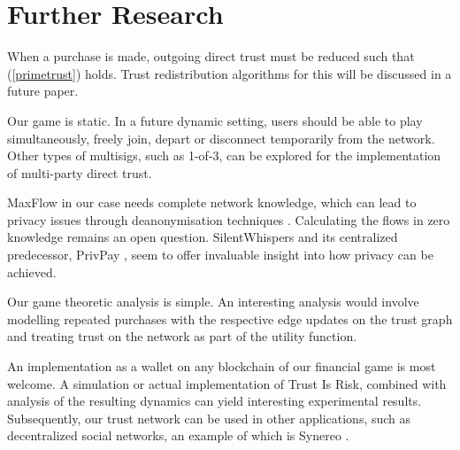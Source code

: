 \section{Further Research}

    When a purchase is made, outgoing direct trust must be reduced such that (\ref{primetrust}) holds. Trust redistribution
    algorithms for this will be discussed in a future paper.
    
    Our game is static. In a future dynamic setting, users should be able to play simultaneously, freely join, depart or
    disconnect temporarily from the network. Other types of multisigs, such as 1-of-3, can be explored for the
    implementation of multi-party direct trust.

    MaxFlow in our case needs complete network knowledge, which can lead to privacy issues through deanonymisation
    techniques \cite{deanonymisation}. Calculating the flows in zero knowledge remains an open question.
    SilentWhispers \cite{silentwhispers} and its centralized predecessor, PrivPay \cite{privpay}, seem to offer invaluable
    insight into how privacy can be achieved.

    Our game theoretic analysis is simple. An interesting analysis would involve modelling repeated purchases with the
    respective edge updates on the trust graph and treating trust on the network as part of the utility function.

    An implementation as a wallet on any blockchain of our financial game is most welcome. A simulation or actual
    implementation of Trust Is Risk, combined with analysis of the resulting dynamics can yield interesting experimental
    results. Subsequently, our trust network can be used in other applications, such as decentralized social networks, an
    example of which is Synereo \cite{synereo}.

